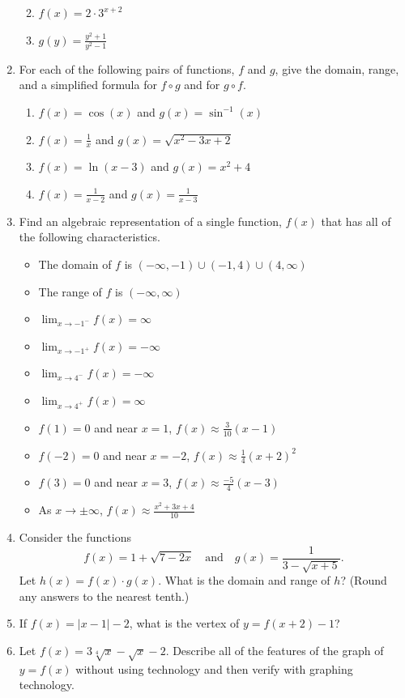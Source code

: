\documentclass[
]{book}
\providecommand{\tightlist}{%
  \setlength{\itemsep}{0pt}\setlength{\parskip}{0pt}}
\theoremstyle{definition}
\theoremstyle{definition}
\theoremstyle{definition}
\theoremstyle{remark}
\begin{document}
\begin{enumerate}
  \begin{enumerate}
  \def\labelenumii{\alph{enumii}.}
  \tightlist
  \item
    \(f(x)=2\cdot 3^{x+2}\)
  \item
    \(g(y)=\frac{y^2+1}{y^2-1}\)
  \end{enumerate}
\item
  For each of the following pairs of functions, \(f\) and \(g\), give the domain, range, and a simplified formula for \(f\circ g\) and for \(g \circ f\).

  \begin{enumerate}
  \def\labelenumii{\alph{enumii}.}
  \tightlist
  \item
    \(f(x)=\cos (x)\) and \(g(x)=\sin^{-1}(x)\)
  \item
    \(f(x)=\frac{1}{x}\) and \(g(x)=\sqrt{x^2-3x+2}\)
  \item
    \(f(x)=\ln(x-3)\) and \(g(x)=x^2+4\)
  \item
    \(f(x)=\frac{1}{x-2}\) and \(g(x)=\frac{1}{x-3}\)
  \end{enumerate}
\item
  Find an algebraic representation of a single function, \(f(x)\) that has all of the following characteristics.

  \begin{itemize}
  \tightlist
  \item
    The domain of \(f\) is \((-\infty, -1) \cup (-1,4) \cup (4,\infty)\)
  \item
    The range of \(f\) is \((-\infty,\infty)\)
  \item
    \(\displaystyle{\lim_{x \rightarrow -1^-} f(x) = \infty}\)
  \item
    \(\displaystyle{\lim_{x \rightarrow -1^+} f(x) = -\infty}\)
  \item
    \(\displaystyle{\lim_{x \rightarrow 4^-} f(x) = -\infty}\)
  \item
    \(\displaystyle{\lim_{x \rightarrow 4^+} f(x) = \infty}\)
  \item
    \(f(1)=0\) and near \(x=1\), \(\displaystyle{f(x)\approx \frac{3}{10}(x-1)}\)
  \item
    \(f(-2)=0\) and near \(x=-2\), \(\displaystyle{f(x) \approx \frac{1}{4}(x+2)^2}\)
  \item
    \(f(3)=0\) and near \(x=3\), \(\displaystyle{f(x) \approx \frac{-5}{4}(x-3)}\)
  \item
    As \(x\rightarrow \pm \infty\), \(\displaystyle{f(x) \approx \frac{x^2+3x+4}{10}}\)
  \end{itemize}
\item
  Consider the functions \[f(x)=1+\sqrt{7-2x} \quad \mbox{and} \quad g(x)=\frac{1}{3-\sqrt{x+5}}.\]
  Let \(h(x)=f(x) \cdot g(x)\). What is the domain and range of \(h\)? (Round any answers to the nearest tenth.)
\item
  If \(f(x)=|x-1|-2\), what is the vertex of \(y=f(x+2)-1\)?
\item
  Let \(f(x)=3\sqrt[4]{x} - \sqrt{x} -2\). Describe all of the features of the graph of \(y=f(x)\) without using technology and then verify with graphing technology.
\end{enumerate}
\end{document}
